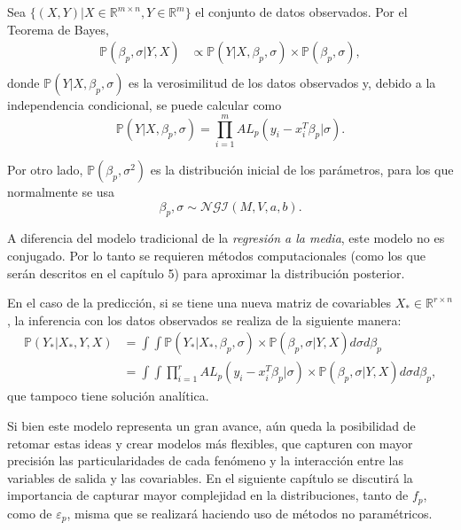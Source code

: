 Sea $\{(X,Y) | X \in \mathbb{R}^{m \times n}, Y \in \mathbb{R}^m\}$ el conjunto de datos observados. Por el Teorema de Bayes,
\begin{equation*}
\begin{aligned}
    \mathbb{P}(\beta_p,\sigma | Y, X) 
    &\propto \mathbb{P}(Y| X, \beta_p, \sigma) \times \mathbb{P}(\beta_p, \sigma), \\
\end{aligned}
\end{equation*}
donde $\mathbb{P}(Y| X, \beta_p, \sigma)$ es la verosimilitud de los datos observados y, debido a la independencia condicional, se puede calcular como 
\begin{equation*}
    \mathbb{P}(Y| X, \beta_p, \sigma)
    =
    \prod_{i=1}^m AL_p(y_i - x_i^T\beta_p|\sigma).
\end{equation*}

Por otro lado, $\mathbb{P}(\beta_p,\sigma^2)$ es la distribuci\'on inicial de los par\'ametros, para los que normalmente se usa
\begin{equation*}
    \beta_p,\sigma \sim \mathcal{NGI}(M,V,a,b). 
\end{equation*}

A diferencia del modelo tradicional de la \textit{regresi\'on a la media}, este modelo no es conjugado. Por lo tanto se requieren m\'etodos computacionales (como los que ser\'an descritos en el cap\'itulo 5) para aproximar la distribuci\'on posterior.

En el caso de la predicci\'on, si se tiene una nueva matriz de covariables $X_* \in \mathbb{R}^{r \times n}$, la inferencia con los datos observados se realiza de la siguiente manera:
\begin{equation*}
\begin{aligned}
    \mathbb{P}(Y_*|X_*,Y,X)
    &= \int \int \mathbb{P}(Y_*|X_*,\beta_p,\sigma) \times \mathbb{P}(\beta_p,\sigma|Y,X) d\sigma d\beta_p \\
    &= \int \int \prod_{i=1}^r AL_p(y_i - x_i^T\beta_p|\sigma) \times \mathbb{P}(\beta_p,\sigma|Y,X) d\sigma d\beta_p,
\end{aligned}
\end{equation*}
que tampoco tiene soluci\'on anal\'itica.

Si bien este modelo representa un gran avance, a\'un queda la posibilidad de retomar estas ideas y crear modelos m\'as flexibles, que capturen con mayor precisi\'on las particularidades de cada fen\'omeno y la interacci\'on entre las variables de salida y las covariables. En el siguiente cap\'itulo se discutir\'a la importancia de capturar mayor complejidad en la distribuciones, tanto de $f_p$, como de $\varepsilon_p$, misma que se realizar\'a haciendo uso de m\'etodos no param\'etricos.